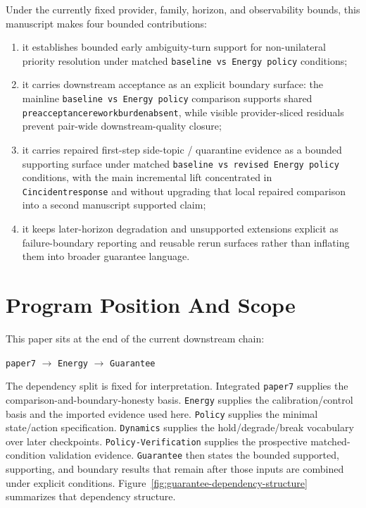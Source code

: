 \documentclass[11pt]{article}
\renewcommand{\_}{\textunderscore\hspace{0pt}}
\begin{document}
Under the currently fixed provider, family, horizon, and observability bounds,
this manuscript makes four bounded contributions:

\begin{enumerate}
\item it establishes bounded early ambiguity-turn support for non-unilateral
priority resolution under matched \texttt{baseline vs Energy policy}
conditions;
\item it carries downstream acceptance as an explicit boundary surface: the
mainline \texttt{baseline vs Energy policy} comparison supports shared
\texttt{preacceptance\_rework\_burden\_absent}, while visible provider-sliced
residuals prevent pair-wide downstream-quality closure;
\item it carries repaired first-step side-topic / quarantine evidence as a
bounded supporting surface under matched
\texttt{baseline vs revised Energy policy} conditions, with the main
incremental lift concentrated in \texttt{C\_incident\_response} and without
upgrading that local repaired comparison into a second manuscript supported
claim;
\item it keeps later-horizon degradation and unsupported extensions explicit as
failure-boundary reporting and reusable rerun surfaces rather than inflating
them into broader guarantee language.
\end{enumerate}

\section{Program Position And Scope}

This paper sits at the end of the current downstream chain:

\begin{center}
\texttt{paper7} $\rightarrow$ \texttt{Energy} $\rightarrow$ \texttt{Guarantee}
\end{center}

\noindent The dependency split is fixed for interpretation. Integrated
\texttt{paper7} supplies the comparison-and-boundary-honesty basis.
\texttt{Energy} supplies the calibration/control basis and the imported
evidence used here.
\texttt{Policy} supplies the minimal state/action specification.
\texttt{Dynamics} supplies the hold/degrade/break vocabulary over later
checkpoints. \texttt{Policy-Verification} supplies the prospective matched-
condition validation evidence. \texttt{Guarantee} then states the bounded
supported, supporting, and boundary results that remain after those inputs are
combined under explicit conditions. Figure~\ref{fig:guarantee-dependency-structure}
summarizes that dependency structure.
\end{document}
